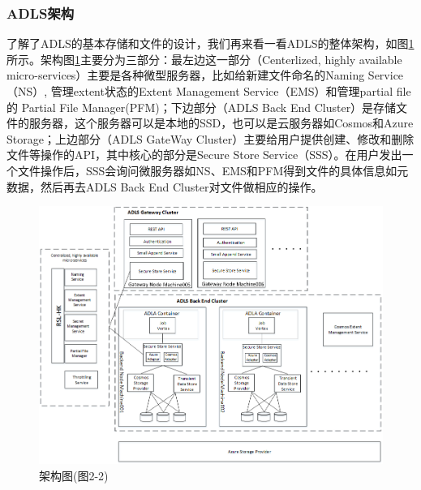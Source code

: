 \documentclass[11pt]{article}
\begin{document}
\subsubsection{ADLS架构}
了解了ADLS的基本存储和文件的设计，我们再来看一看ADLS的整体架构，如图\ref{fig:ADLS-arc}所示。架构图\ref{fig:ADLS-arc}主要分为三部分：最左边这一部分（Centerlized, highly available micro-services）主要是各种微型服务器，比如给新建文件命名的Naming Service（NS）, 管理extent状态的Extent Management Service（EMS）和管理partial file的 Partial File Manager(PFM)；下边部分（ADLS Back End Cluster）是存储文件的服务器，这个服务器可以是本地的SSD，也可以是云服务器如Cosmos和Azure Storage；上边部分（ADLS GateWay Cluster）主要给用户提供创建、修改和删除文件等操作的API，其中核心的部分是Secure Store Service（SSS）。在用户发出一个文件操作后，SSS会询问微服务器如NS、EMS和PFM得到文件的具体信息如元数据，然后再去ADLS Back End Cluster对文件做相应的操作。
\begin{figure}[!htbp]
	\centering
	\includegraphics[width=0.84\linewidth]{figs/ADLS-arc.png}
	\caption{架构图(\cite{ramakrishnan2017azure}图2-2)}%
	\label{fig:ADLS-arc}
\end{figure}
\end{document}
